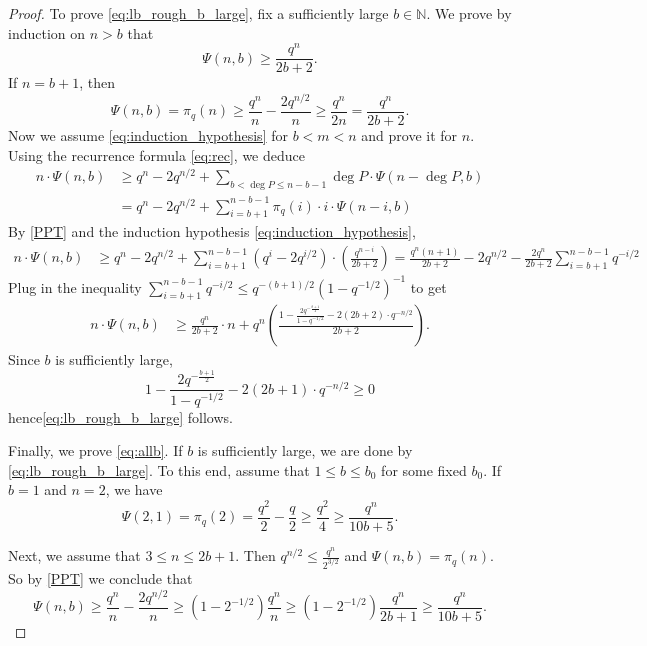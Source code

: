 \documentclass[12pt]{amsart}
\numberwithin{equation}{section}
\theoremstyle{definition}
\theoremstyle{remark}
\newcommand{\NN}{\mathbb{N}}
\newcommand{\ps}[1]{\left( #1 \right)}
\begin{document}
\begin{proof}
    To prove \eqref{eq:lb_rough_b_large}, fix a sufficiently large $b \in \NN$. We prove by induction on $n>b$ that 
    \begin{equation}\label{eq:induction_hypothesis}
        \Psi(n,b) \geq \frac{q^n}{2b+2}.
    \end{equation} 
    If $n = b+1$, then 
    \[
        \Psi(n,b) = \pi_q(n) \geq \frac{q^n}{n} - \frac{2q^{n/2}}{n} \geq \frac{q^n}{2n} = \frac{q^n}{2b+2}.
    \]
    Now we assume \eqref{eq:induction_hypothesis} for $b < m < n$ and prove it for $n$. Using the recurrence formula \eqref{eq:rec}, we deduce
    \begin{align*}
        n \cdot \Psi(n,b) &\geq q^n - 2q^{n/2} + \sum_{b<\deg P \leq n-b-1} \deg P \cdot \Psi(n-\deg P, b) \\
        &= q^n - 2q^{n/2} + \sum_{i=b+1}^{n-b-1} \pi_q(i) \cdot i \cdot \Psi(n-i, b)
    \end{align*}
    By \eqref{PPT} and the induction hypothesis \eqref{eq:induction_hypothesis},  
    \begin{align*}
        n \cdot \Psi(n,b)&\geq q^n - 2q^{n/2} +  \sum_{i=b+1}^{n-b-1} (q^i - 2q^{i/2}) \cdot \ps{\frac{q^{n-i}}{2b+2}} = \frac{q^n(n+1)}{2b+2} - 2q^{n/2} -\frac{2q^n}{2b+2}\sum_{i=b+1}^{n-b-1} {q^{-i/2}}
    \end{align*}
    Plug in the inequality $\sum_{i=b+1}^{n-b-1}q^{-i/2} \leq q^{-(b+1)/2}(1-q^{-1/2})^{-1}$ to get 
    \begin{align*}
    n \cdot \Psi(n,b)&\geq
        \frac{q^n}{2b+2} \cdot n + q^n \ps{\frac{1-\frac{2q^{-\frac{b+1}{2}}}{1-q^{-1/2}} - 2(2b+2) \cdot q^{-n/2}}{2b+2}}.
    \end{align*}
    Since $b$ is sufficiently large, 
    \[
        1-\frac{2q^{-\frac{b+1}{2}}}{1-q^{-1/2}} - 2(2b+1) \cdot q^{-n/2} \geq 0
    \]
    hence\eqref{eq:lb_rough_b_large} follows.
    
    Finally, we prove \eqref{eq:allb}. If $b$ is sufficiently large, we are done by \eqref{eq:lb_rough_b_large}. To this end, assume that $1\leq b \leq b_0$ for some fixed $b_0$. 
    If $b=1$ and $n=2$, we have
    \begin{equation}\label{uniform lower bound rough: base 1}
        \Psi(2,1) = \pi_q(2) = \frac{q^2}{2} - \frac{q}{2} \geq \frac{q^2}{4}\geq \frac{q^n}{10b+5}.
    \end{equation} 
    
    Next,  we assume that $3 \leq n \leq 2b+1$. Then $q^{n/2} \leq \frac{q^n}{2^{3/2}}$ and $\Psi(n,b)=\pi_q(n)$. So  by \eqref{PPT} we conclude that 
    \begin{equation}\label{uniform lower bound rough: base 2}
        \Psi(n,b)\geq \frac{q^n}{n} - \frac{2q^{n/2}}{n} \geq (1-2^{-1/2})\frac{q^n}{n} \geq (1-2^{-1/2})\frac{q^n}{2b+1} \geq \frac{q^n}{10 b+5}.
    \end{equation}
    

\end{proof}
\end{document}
